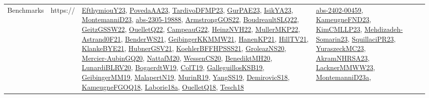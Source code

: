 {\begin{longtable}{lp{3cm}>{\raggedright}p{6cm}>{\raggedright}p{6cm}p{8cm}}
Benchmarks & https:// & \href{papers/EfthymiouY23.pdf}{EfthymiouY23}\cite{EfthymiouY23}, \href{papers/PovedaAA23.pdf}{PovedaAA23}\cite{PovedaAA23}, \href{papers/TardivoDFMP23.pdf}{TardivoDFMP23}\cite{TardivoDFMP23}, \href{articles/GurPAE23.pdf}{GurPAE23}\cite{GurPAE23}, \href{articles/IsikYA23.pdf}{IsikYA23}\cite{IsikYA23}, \href{articles/MontemanniD23.pdf}{MontemanniD23}\cite{MontemanniD23}, \href{articles/abs-2305-19888.pdf}{abs-2305-19888}\cite{abs-2305-19888}, \href{papers/ArmstrongGOS22.pdf}{ArmstrongGOS22}\cite{ArmstrongGOS22}, \href{papers/BoudreaultSLQ22.pdf}{BoudreaultSLQ22}\cite{BoudreaultSLQ22}, \href{papers/GeitzGSSW22.pdf}{GeitzGSSW22}\cite{GeitzGSSW22}, \href{papers/OuelletQ22.pdf}{OuelletQ22}\cite{OuelletQ22}, \href{articles/CampeauG22.pdf}{CampeauG22}\cite{CampeauG22}, \href{articles/HeinzNVH22.pdf}{HeinzNVH22}\cite{HeinzNVH22}, \href{articles/MullerMKP22.pdf}{MullerMKP22}\cite{MullerMKP22}, \href{papers/Astrand0F21.pdf}{Astrand0F21}\cite{Astrand0F21}, \href{papers/BenderWS21.pdf}{BenderWS21}\cite{BenderWS21}, \href{papers/GeibingerKKMMW21.pdf}{GeibingerKKMMW21}\cite{GeibingerKKMMW21}, \href{papers/HanenKP21.pdf}{HanenKP21}\cite{HanenKP21}, \href{papers/HillTV21.pdf}{HillTV21}\cite{HillTV21}, \href{papers/KlankeBYE21.pdf}{KlankeBYE21}\cite{KlankeBYE21}, \href{articles/HubnerGSV21.pdf}{HubnerGSV21}\cite{HubnerGSV21}, \href{articles/KoehlerBFFHPSSS21.pdf}{KoehlerBFFHPSSS21}\cite{KoehlerBFFHPSSS21}, \href{papers/GroleazNS20.pdf}{GroleazNS20}\cite{GroleazNS20}, \href{papers/Mercier-AubinGQ20.pdf}{Mercier-AubinGQ20}\cite{Mercier-AubinGQ20}, \href{papers/NattafM20.pdf}{NattafM20}\cite{NattafM20}, \href{papers/WessenCS20.pdf}{WessenCS20}\cite{WessenCS20}, \href{articles/BenediktMH20.pdf}{BenediktMH20}\cite{BenediktMH20}, \href{articles/LunardiBLRV20.pdf}{LunardiBLRV20}\cite{LunardiBLRV20}, \href{papers/BogaerdtW19.pdf}{BogaerdtW19}\cite{BogaerdtW19}, \href{papers/ColT19.pdf}{ColT19}\cite{ColT19}, \href{papers/GalleguillosKSB19.pdf}{GalleguillosKSB19}\cite{GalleguillosKSB19}, \href{papers/GeibingerMM19.pdf}{GeibingerMM19}\cite{GeibingerMM19}, \href{papers/MalapertN19.pdf}{MalapertN19}\cite{MalapertN19}, \href{papers/MurinR19.pdf}{MurinR19}\cite{MurinR19}, \href{papers/YangSS19.pdf}{YangSS19}\cite{YangSS19}, \href{papers/DemirovicS18.pdf}{DemirovicS18}\cite{DemirovicS18}, \href{papers/KameugneFGOQ18.pdf}{KameugneFGOQ18}\cite{KameugneFGOQ18}, \href{papers/Laborie18a.pdf}{Laborie18a}\cite{Laborie18a}, \href{papers/OuelletQ18.pdf}{OuelletQ18}\cite{OuelletQ18}, \href{papers/Tesch18.pdf}{Tesch18}\cite{Tesch18} & \href{articles/abs-2402-00459.pdf}{abs-2402-00459}\cite{abs-2402-00459}, \href{papers/KameugneFND23.pdf}{KameugneFND23}\cite{KameugneFND23}, \href{papers/KimCMLLP23.pdf}{KimCMLLP23}\cite{KimCMLLP23}, \href{papers/Mehdizadeh-Somarin23.pdf}{Mehdizadeh-Somarin23}\cite{Mehdizadeh-Somarin23}, \href{papers/SquillaciPR23.pdf}{SquillaciPR23}\cite{SquillaciPR23}, \href{papers/YuraszeckMC23.pdf}{YuraszeckMC23}\cite{YuraszeckMC23}, \href{articles/AkramNHRSA23.pdf}{AkramNHRSA23}\cite{AkramNHRSA23}, \href{articles/LacknerMMWW23.pdf}{LacknerMMWW23}\cite{LacknerMMWW23}, \href{articles/MontemanniD23a.pdf}{MontemanniD23a}\cite{MontemanniD23a}, 
\end{longtable}}
